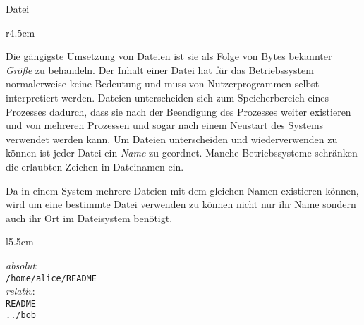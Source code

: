 \documentclass[12pt]{article}
\begin{document}
\begin{defbox}[breakable]{Datei}
\begin{wrapfigure}[8]{r}{4.5cm}
\vspace{-0.5cm}
\caption{Vereinfachte Klassenkarte einer Datei}
\label{fig:file_class}
\end{wrapfigure}
Die gängigste Umsetzung von Dateien ist sie als Folge von Bytes bekannter \emph{Größe} zu behandeln.
Der Inhalt einer Datei hat für das Betriebssystem normalerweise keine Bedeutung und muss von Nutzerprogrammen selbst interpretiert werden.
Dateien unterscheiden sich zum Speicherbereich eines Prozesses dadurch, dass sie nach der Beendigung des Prozesses weiter existieren und von mehreren Prozessen und sogar nach einem Neustart des Systems verwendet werden kann.
Um Dateien unterscheiden und wiederverwenden zu können ist jeder Datei ein \emph{Name} zu geordnet.
Manche Betriebssysteme schränken die erlaubten Zeichen in Dateinamen ein.
\end{defbox}


Da in einem System mehrere Dateien mit dem gleichen Namen existieren können, wird um eine bestimmte Datei verwenden zu können nicht nur ihr Name sondern auch ihr Ort im Dateisystem benötigt.

\begin{wrapfigure}[8]{l}{5.5cm}
\vspace{-0.5cm}
\begin{expbox}
\emph{absolut}: \\
\phantom{ }\hspace{0.2cm}\texttt{/home/alice/README} \\
\emph{relativ}: \\
\phantom{ }\hspace{0.2cm}\texttt{README} \\
\phantom{ }\hspace{0.2cm}\texttt{../bob} \\
\end{expbox}
\end{wrapfigure}
\end{document}
